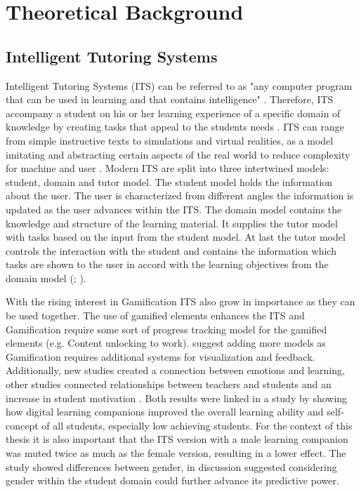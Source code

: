 \section{Theoretical Background}

\subsection{Intelligent Tutoring Systems}
Intelligent Tutoring Systems (ITS) can be referred to as "any computer program that can be used in learning and that contains intelligence" \>\parencite{freedmanLinksWhatIntelligent2000}.
Therefore, ITS accompany a student on his or her learning experience of a specific domain of knowledge by creating tasks that appeal to the students needs \parencite{gonzalezGamificationIntelligentTutoring2014}.
ITS can range from simple instructive texts to simulations and virtual realities, as a model imitating and abstracting certain aspects of the real world to reduce complexity for machine and user \parencite{psotkaIntelligentTutoringSystems1988}.
Modern ITS are split into three intertwined models: student, domain and tutor model. The student model holds the information about the user.
The user is characterized from different angles the information is updated as the user advances within the ITS.
The domain model contains the knowledge and structure of the learning material. It supplies the tutor model with tasks based on the input from the student model.
At last the tutor model controls the interaction with the student and contains the information which tasks are shown to the user in accord with the learning objectives from the domain model (\cite{gonzalezGamificationIntelligentTutoring2014}; \cite{freedmanLinksWhatIntelligent2000}).

With the rising interest in Gamification ITS also grow in importance as they can be used together. The use of gamified elements enhances the ITS and Gamification require some sort of progress tracking model for the gamified elements (e.g. Content unlocking to work).
\Textcite{gonzalezGamificationIntelligentTutoring2014} suggest adding more models as Gamification requires additional systems for visualization and feedback.
Additionally, new studies created a connection between emotions and learning, other studies connected relationships between teachers and students and an increase in student motivation \parencite{woolfAffectiveTutorsAutomatic2010}.
Both results were linked in a study by \Textcite{woolfAffectiveTutorsAutomatic2010} showing how digital learning companions improved the overall learning ability and self-concept of all students, especially low achieving students.
For the context of this thesis it is also important that the ITS version with a male learning companion was muted twice as much as the female version, resulting in a lower effect.
The study showed differences between gender, in discussion \Textcite{woolfAffectiveTutorsAutomatic2010} suggested considering gender within the student domain could further advance its predictive power.


